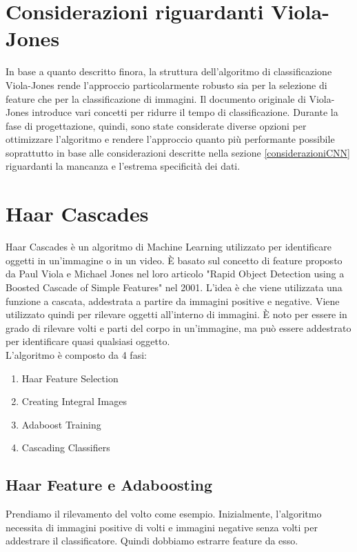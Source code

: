 \section{Considerazioni riguardanti Viola-Jones}
\vspace{8mm}
In base a quanto descritto finora, la struttura dell'algoritmo di classificazione Viola-Jones rende l'approccio particolarmente robusto sia per la selezione di feature che per la classificazione di immagini. Il documento originale di Viola-Jones introduce vari concetti per ridurre il tempo di classificazione.
Durante la fase di progettazione, quindi, sono state considerate diverse opzioni per ottimizzare l'algoritmo e rendere l'approccio quanto più performante possibile soprattutto in base alle considerazioni descritte nella sezione \ref{considerazioniCNN} riguardanti la mancanza e l'estrema specificità dei dati.
\newpage

\section{Haar Cascades}
\vspace{8mm}

Haar Cascades è un algoritmo di Machine Learning utilizzato per identificare oggetti in un'immagine o in un video. È basato sul concetto di feature proposto da Paul Viola e Michael Jones nel loro articolo "Rapid Object Detection using a Boosted Cascade of Simple Features" nel 2001. L'idea è che viene utilizzata una funzione a cascata, addestrata a partire da immagini positive e negative. Viene utilizzato quindi per rilevare oggetti all'interno di immagini. È noto per essere in grado di rilevare volti e parti del corpo in un'immagine, ma può essere addestrato per identificare quasi qualsiasi oggetto.
\\
L'algoritmo è composto da 4 fasi:

\begin{enumerate}
  \item Haar Feature Selection
  \item Creating Integral Images
  \item Adaboost Training
  \item Cascading Classifiers
\end{enumerate}

\subsection{Haar Feature e Adaboosting}
Prendiamo il rilevamento del volto come esempio. Inizialmente, l'algoritmo necessita di immagini positive di volti e immagini negative senza volti per addestrare il classificatore. Quindi dobbiamo estrarre feature da esso.\newpage

